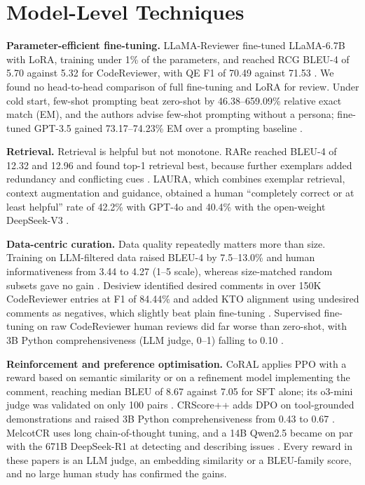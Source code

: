 \section{Model-Level Techniques}\label{sec:techniques}

\textbf{Parameter-efficient fine-tuning.} LLaMA-Reviewer fine-tuned LLaMA-6.7B with LoRA, training under 1\% of the parameters, and reached RCG BLEU-4 of 5.70 against 5.32 for CodeReviewer, with QE F1 of 70.49 against 71.53 \cite{lu2023llamareviewer}. We found no head-to-head comparison of full fine-tuning and LoRA for review. Under cold start, few-shot prompting beat zero-shot by 46.38--659.09\% relative exact match (EM), and the authors advise few-shot prompting without a persona; fine-tuned GPT-3.5 gained 73.17--74.23\% EM over a prompting baseline \cite{pornprasit2024finetuning}.

\textbf{Retrieval.} Retrieval is helpful but not monotone. RARe reached BLEU-4 of 12.32 and 12.96 and found top-1 retrieval best, because further exemplars added redundancy and conflicting cues \cite{meng2025retrieval}. LAURA, which combines exemplar retrieval, context augmentation and guidance, obtained a human ``completely correct or at least helpful'' rate of 42.2\% with GPT-4o and 40.4\% with the open-weight DeepSeek-V3 \cite{zhang2025laura}.

\textbf{Data-centric curation.} Data quality repeatedly matters more than size. Training on LLM-filtered data raised BLEU-4 by 7.5--13.0\% and human informativeness from 3.44 to 4.27 (1--5 scale), whereas size-matched random subsets gave no gain \cite{liu2025noisy}. Desiview identified desired comments in over 150K CodeReviewer entries at F1 of 84.44\% and added KTO alignment using undesired comments as negatives, which slightly beat plain fine-tuning \cite{yu2024distilling}. Supervised fine-tuning on raw CodeReviewer human reviews did far worse than zero-shot, with 3B Python comprehensiveness (LLM judge, 0--1) falling to 0.10 \cite{kapadnis2025crscore}.

\textbf{Reinforcement and preference optimisation.} CoRAL applies PPO with a reward based on semantic similarity or on a refinement model implementing the comment, reaching median BLEU of 8.67 against 7.05 for SFT alone; its o3-mini judge was validated on only 100 pairs \cite{sghaier2025leveraging}. CRScore++ adds DPO on tool-grounded demonstrations and raised 3B Python comprehensiveness from 0.43 to 0.67 \cite{kapadnis2025crscore}. MelcotCR uses long chain-of-thought tuning, and a 14B Qwen2.5 became on par with the 671B DeepSeek-R1 at detecting and describing issues \cite{yu2025finetuning}. Every reward in these papers is an LLM judge, an embedding similarity or a BLEU-family score, and no large human study has confirmed the gains.

